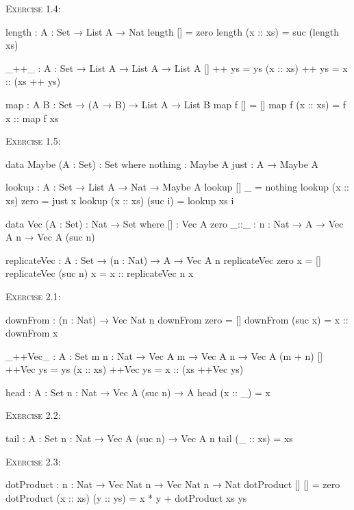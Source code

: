\documentclass{article}
\begin{document}
\noindent
\textsc{Exercise 1.4}:

\begin{code}
length : {A : Set} → List A → Nat
length [] = zero
length (x :: xs) = suc (length xs)

_++_ : {A : Set} → List A → List A → List A
[] ++ ys = ys
(x :: xs) ++ ys = x :: (xs ++ ys)

map : {A B : Set} → (A → B) → List A → List B
map f [] = []
map f (x :: xs) = f x :: map f xs
\end{code}

\noindent
\textsc{Exercise 1.5}:

\begin{code}
data Maybe (A : Set) : Set where
    nothing : Maybe A
    just : A → Maybe A

lookup : {A : Set} → List A → Nat → Maybe A
lookup [] _ = nothing
lookup (x :: xs) zero = just x
lookup (x :: xs) (suc i) = lookup xs i
\end{code}

\begin{code}
data Vec (A : Set) : Nat → Set where
    [] : Vec A zero
    _::_ : {n : Nat} → A → Vec A n → Vec A (suc n)

replicateVec : {A : Set} → (n : Nat) → A → Vec A n
replicateVec zero x = []
replicateVec (suc n) x = x :: replicateVec n x
\end{code}

\noindent
\textsc{Exercise 2.1}:

\begin{code}
downFrom : (n : Nat) → Vec Nat n
downFrom zero = []
downFrom (suc x) = x :: downFrom x
\end{code}

\begin{code}
_++Vec_ : {A : Set} {m n : Nat}
    → Vec A m → Vec A n → Vec A (m + n)
[] ++Vec ys = ys
(x :: xs) ++Vec ys = x :: (xs ++Vec ys)

head : {A : Set} {n : Nat} → Vec A (suc n) → A
head (x :: _) = x
\end{code}

\noindent
\textsc{Exercise 2.2}:

\begin{code}
tail : {A : Set} {n : Nat} → Vec A (suc n) → Vec A n
tail (_ :: xs) = xs
\end{code}

\noindent
\textsc{Exercise 2.3}:

\begin{code}
dotProduct : {n : Nat} → Vec Nat n → Vec Nat n → Nat
dotProduct [] [] = zero
dotProduct (x :: xs) (y :: ys) = x * y + dotProduct xs ys
\end{code}
\end{document}
